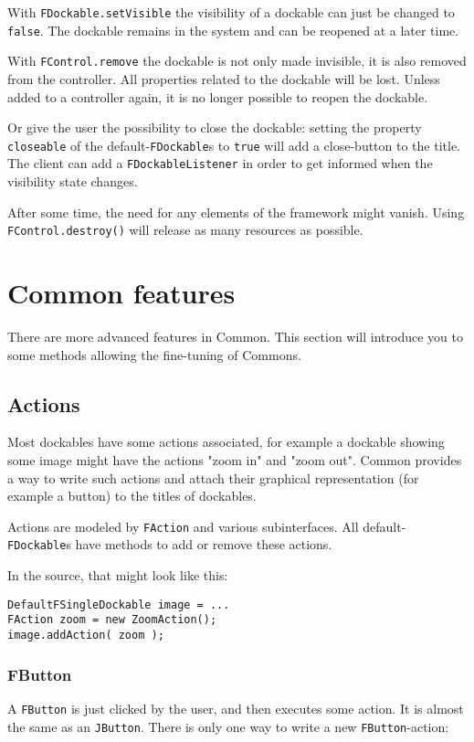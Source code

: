 \documentclass[a4paper,10pt]{article}
\newcommand{\src}[1]{\lstinline[basicstyle=\ttfamily]|#1|}
\begin{document}
With \src{FDockable.setVisible} the visibility of a dockable can just be changed to \src{false}. The dockable remains in the system and can be reopened at a later time.

With \src{FControl.remove} the dockable is not only made invisible, it is also removed from the controller. All properties related to the dockable will be lost. Unless added to a controller again, it is no longer possible to reopen the dockable.

Or give the user the possibility to close the dockable: setting the property \src{closeable} of the default-\src{FDockable}s to \src{true} will add a close-button to the title. The client can add a \src{FDockableListener} in order to get informed when the visibility state changes.

After some time, the need for any elements of the framework might vanish. Using \src{FControl.destroy()} will release as many resources as possible.

\section{Common features}
There are more advanced features in Common. This section will introduce you to some methods allowing the fine-tuning of Commons.

\subsection{Actions}
Most dockables have some actions associated, for example a dockable showing some image might have the actions "zoom in" and "zoom out". Common provides a way to write such actions and attach their graphical representation (for example a button) to the titles of dockables. 

Actions are modeled by \src{FAction} and various subinterfaces. All default-\src{FDockable}s have methods to add or remove these actions.

In the source, that might look like this:
\begin{lstlisting}
DefaultFSingleDockable image = ...
FAction zoom = new ZoomAction();
image.addAction( zoom );
\end{lstlisting}

\subsubsection{FButton}
A \src{FButton} is just clicked by the user, and then executes some action. It is almost the same as an \src{JButton}. There is only one way to write a new \src{FButton}-action:
\end{document}
